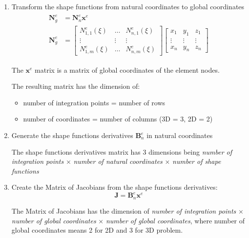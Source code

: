 \documentclass[10pt,b5paper,titlepage]{book}
\newenvironment{eqarray}
{
    \begin{eqnarray}
        \begin{aligned}
}
{
        \end{aligned}
    \end{eqnarray}
}
\begin{document}
\begin{enumerate}
    \item Transform the shape functions from natural coordinates to global coordinates
        \begin{eqarray}
            \mathbf{N}_g^e &= \mathbf{N}_n^e \mathbf{x}^e\\
            \mathbf{N}_g^e &= \begin{bmatrix}
                N_{1,1}^e(\xi) & \dots & N_{n,1}^e(\xi)\\
                \vdots & \vdots & \vdots\\
                N_{1,m}^e(\xi) & \dots & N_{n,m}^e(\xi)
            \end{bmatrix}
            \begin{bmatrix}
                x_1 & y_1 & z_1\\
                \vdots & \vdots & \vdots\\
                x_n & y_n & z_n
            \end{bmatrix}
        \end{eqarray}

        The $ \mathbf{x}^e $ matrix is a matrix of global coordinates of the element nodes.

        The resulting matrix has the dimension of:
        \begin{itemize}
            \item number of integration points = number of rows
            \item number of coordinates = number of columns (3D = 3, 2D = 2)
        \end{itemize}

    \item Generate the shape functions derivatives $ \mathbf{B}_n^e $
        in natural coordinates

        The shape functions derivatives matrix has 3 dimensions being
        \textit{number of integration points} $\times$ \textit{number of natural coordinates}
        $\times$ \textit{number of shape functions}

    \item Create the Matrix of Jacobians from the shape functions derivatives:
        \begin{equation}
            \mathbf{J} = \mathbf{B}_n^e \mathbf{x}^e
        \end{equation}

        The Matrix of Jacobians has the dimension of \textit{number of integration points}
        $\times$ \textit{number of global coordinates}
        $\times$ \textit{number of global coordinates}, where number of global coordinates
        means 2 for 2D and 3 for 3D problem.


\end{enumerate}
\end{document}

